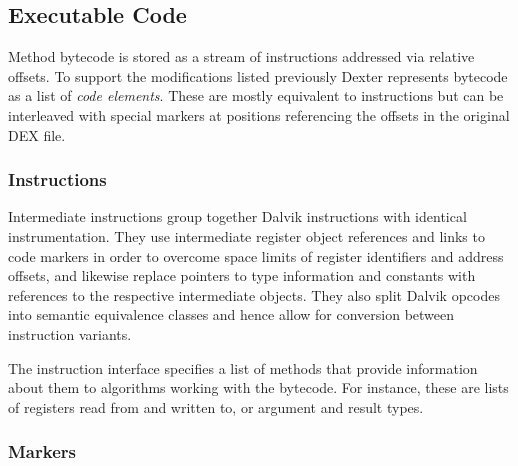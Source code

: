 \documentclass[12pt,twoside,notitlepage]{report}
\begin{document}

\subsection{Executable Code}

Method bytecode is stored as a stream of instructions addressed via relative offsets. To support the modifications listed previously Dexter represents bytecode as a list of \emph{code elements}. These are mostly equivalent to instructions but can be interleaved with special markers at positions referencing the offsets in the original DEX file.

\subsubsection{Instructions}

Intermediate instructions group together Dalvik instructions with identical instrumentation. They use intermediate register object references and links to code markers in order to overcome space limits of register identifiers and address offsets, and likewise replace pointers to type information and constants with references to the respective intermediate objects. They also split Dalvik opcodes into semantic equivalence classes and hence allow for conversion between instruction variants.

The instruction interface specifies a list of methods that provide information about them to algorithms working with the bytecode. For instance, these are lists of registers read from and written to, or argument and result types.

\subsubsection{Markers}
\end{document}
